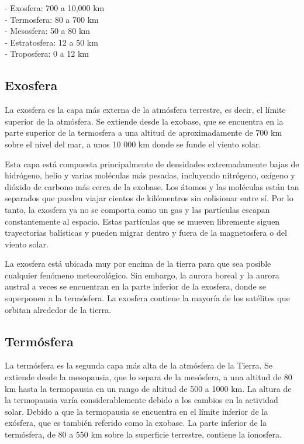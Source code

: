 \documentclass[12pt]{article}
\begin{document}
- Exosfera: 700 a 10,000 km \\- Termosfera: 80 a 700 km \\- Mesosfera: 50 a 80 km \\- Estratosfera: 12 a 50 km\\- Troposfera: 0 a 12 km

\subsection{Exosfera}

La exosfera es la capa más externa de la atmósfera terrestre, es decir, el límite superior de la atmósfera. Se extiende desde la exobase, que se encuentra en la parte superior de la termosfera a una altitud de aproximadamente de 700 km sobre el nivel del mar, a unos 10 000 km donde se funde el viento solar.

Esta capa está compuesta principalmente de densidades extremadamente bajas de hidrógeno, helio y varias moléculas más pesadas, incluyendo nitrógeno, oxígeno y dióxido de carbono más cerca de la exobase. Los átomos y las moléculas están tan separados que pueden viajar cientos de kilómentros sin colisionar entre sí. Por lo tanto, la exosfera ya no se comporta como un gas y las partículas escapan constantemente al espacio. Estas partículas que se mueven libremente siguen trayectorias balísticas y pueden migrar dentro y fuera de la magnetosfera o del viento solar.

La exosfera está ubicada muy por encima de la tierra para que sea posible cualquier fenómeno meteorológico. Sin embargo, la aurora boreal y la aurora austral a veces se encuentran en la parte inferior de la exosfera, donde se superponen a la termósfera. La exosfera contiene la mayoría de los satélites que orbitan alrededor de la tierra.

\subsection{Termósfera}

La termósfera es la segunda capa más alta de la atmósfera de la Tierra. Se extiende desde la mesopausia, que lo separa de la mesósfera, a una altitud de 80 km hasta la termopausia en un rango de altitud de 500 a 1000 km. La altura de la termopausia varía considerablemente debido a los cambios en la actividad solar. Debido a que la termopausia se encuentra en el límite inferior de la exósfera, que es también referido como la exobase. La parte inferior de la termósfera, de 80 a 550 km sobre la superficie terrestre, contiene la ionosfera.
\end{document}
